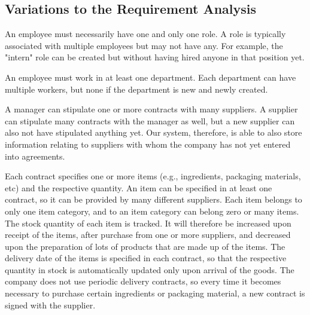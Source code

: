 \subsection{Variations to the Requirement Analysis}


An employee must necessarily have one and only one role. A role is typically associated with multiple employees but may not have any. For example, the "intern" role can be created but without having hired anyone in that position yet.

An employee must work in at least one department. Each department can have multiple workers, but none if the department is new and newly created.

A manager can stipulate one or more contracts with many suppliers. A supplier can stipulate many contracts with the manager as well, but a new supplier can also not have stipulated anything yet. Our system, therefore, is able to also store information relating to suppliers with whom the company has not yet entered into agreements.

Each contract specifies one or more items (e.g., ingredients, packaging materials, etc) and the respective quantity. An item can be specified in at least one contract, so it can be provided by many different suppliers. Each item belongs to only one item category, and to an item category can belong zero or many items. The stock quantity of each item is tracked. It will therefore be increased upon receipt of the items, after purchase from one or more suppliers, and decreased upon the preparation of lots of products that are made up of the items. The delivery date of the items is specified in each contract, so that the respective quantity in stock is automatically updated only upon arrival of the goods. The company does not use periodic delivery contracts, so every time it becomes necessary to purchase certain ingredients or packaging material, a new contract is signed with the supplier.


